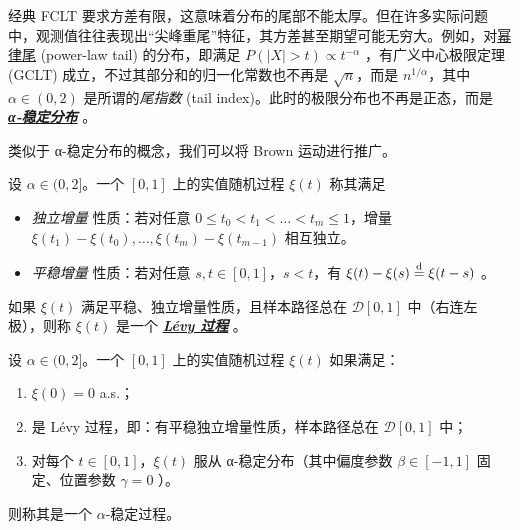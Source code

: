 经典 FCLT 要求方差有限，这意味着分布的尾部不能太厚。但在许多实际问题中，观测值往往表现出``尖峰重尾''特征，其方差甚至期望可能无穷大。例如，对\href{https://en.wikipedia.org/wiki/Power_law\#Power-law_probability_distributions}{幂律尾} (power-law tail) 的分布，即满足 $P(|X|>t)\propto t^{-\alpha}$ ，有广义中心极限定理 (GCLT) 成立，不过其部分和的归一化常数也不再是 $\sqrt{n}$，而是 $n^{1/\alpha}$，其中 $\alpha \in (0,2)$ 是所谓的\emph{尾指数} (tail index)。此时的极限分布也不再是正态，而是 \emph{\textbf{\href{https://en.wikipedia.org/wiki/Stable_distribution}{α‑稳定分布}} }。



类似于 α-稳定分布的概念，我们可以将 Brown 运动进行推广。

\begin{definition*}
设 $\alpha\in(0,2]$。一个 $[0,1]$ 上的实值随机过程 $\xi(t)$ 称其满足

\begin{itemize}
\tightlist
\item
  \emph{独立增量} 性质：若对任意 $0 \le t_0 < t_1 < \dots < t_m \le 1$，增量 $\xi(t_1)-\xi(t_0), \dots, \xi(t_m)-\xi(t_{m-1})$ 相互独立。
\item
  \emph{平稳增量} 性质：若对任意 $s,t\in[0,1]$，$s<t$，有 $\xi(t)-\xi(s)\overset{\rm d}=\xi(t-s)$ 。
\end{itemize}

如果 $\xi(t)$ 满足平稳、独立增量性质，且样本路径总在 $\mathcal D[0,1]$ 中（右连左极），则称 $\xi(t)$ 是一个 \textbf{\emph{\href{https://en.wikipedia.org/wiki/L\%C3\%A9vy_process}{Lévy 过程}}} 。
\end{definition*}

\begin{definition*}
设 $\alpha \in (0,2]$。一个 $[0,1]$ 上的实值随机过程 $\xi(t)$ 如果满足：

\begin{enumerate}
\def\labelenumi{\arabic{enumi}.}
\tightlist
\item
  $\xi(0) = 0$ a.s.；
\item
  是 Lévy 过程，即：有平稳独立增量性质，样本路径总在 $\mathcal D[0,1]$ 中；
\item
  对每个 $t \in [0,1]$，$\xi(t)$ 服从 α-稳定分布（其中偏度参数 $\beta\in[-1,1]$ 固定、位置参数 $\gamma=0$ ）。
\end{enumerate}

则称其是一个 $\alpha$-稳定过程。
\end{definition*}

